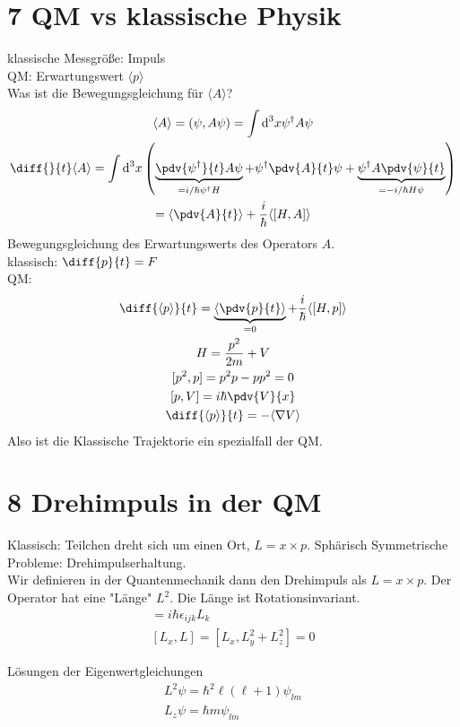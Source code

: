 
\section{7 QM vs klassische Physik}

klassische Messgröße: Impuls\\
QM: Erwartungswert $\langle p \rangle$\\
Was ist die Bewegungsgleichung für $\langle A\rangle$?
\begin{gather}
	\langle A\rangle = (\psi, A\psi) = \int \text d^3x \psi^\dagger A\psi\\
	\diff{}{t}\langle A\rangle = \int\text d^3x \left(\underbrace{\pdv{\psi^\dagger}{t}A\psi}_{= i/\hbar \psi^\dagger H} + \psi^\dagger \pdv{A}{t}\psi + \underbrace{\psi^\dagger A \pdv{\psi}{t}}_{=-i/\hbar H\psi}\right)\\
	= \langle \pdv{A}{t}\rangle + \frac{i}{\hbar}\langle[H,A]\rangle
\end{gather}
Bewegungsgleichung des Erwartungswerts des Operators $A$.\\
klassisch: $\diff{p}{t} = F$\\
QM:
\begin{gather}
	\diff{\langle p\rangle}{t} = \underbrace{\langle \pdv{p}{t}\rangle}_{=0} + \frac{i}{\hbar}\langle[H,p]\rangle\\
	H = \frac{p^2}{2m} + V\\
	[p^2, p] = p^2 p - p p^2 = 0 \\
	[p, V] = i\hbar \pdv{V}{x}\\
	\diff{\langle p \rangle}{t} = -\langle \nabla V\rangle
\end{gather}
Also ist die Klassische Trajektorie ein spezialfall der QM.


\section{8 Drehimpuls in der QM}
Klassisch: Teilchen dreht sich um einen Ort, $L = x\times p$. Sphärisch Symmetrische Probleme: Drehimpulserhaltung.\\
Wir definieren in der Quantenmechanik dann den Drehimpuls als $L = x\times p$. Der Operator hat eine "Länge" $L^2$. Die Länge ist Rotationsinvariant.
\begin{gather}
	[L_i,L_j] = i\hbar \epsilon_{ijk} L_k\\
	[L_x, L] = [L_x,  L_y^2 + L_z^2] = 0
\end{gather}

Lösungen der Eigenwertgleichungen
\begin{gather}
	L^2 \psi = \hbar^2\ell(\ell+1)\psi_{lm}\\
	L_z \psi = \hbar m \psi_{lm}
\end{gather}

